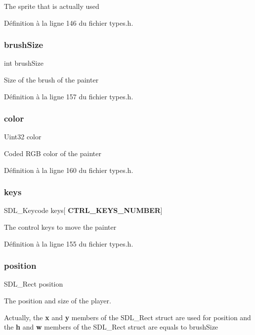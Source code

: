The sprite that is actually used 

Définition à la ligne 146 du fichier types.\+h.

\mbox{\label{structpainter_a9a97e37d5842d96acd10398a11107e96}} 
\subsubsection{brush\+Size}
{\footnotesize\ttfamily int brush\+Size}

Size of the brush of the painter 

Définition à la ligne 157 du fichier types.\+h.

\mbox{\label{structpainter_afd133e412238ed9f1e3ba52397115e8d}} 
\subsubsection{color}
{\footnotesize\ttfamily Uint32 color}

Coded R\+GB color of the painter 

Définition à la ligne 160 du fichier types.\+h.

\mbox{\label{structpainter_aaf7678c8bdea5f0a614d6bdb5af675fb}} 
\subsubsection{keys}
{\footnotesize\ttfamily S\+D\+L\+\_\+\+Keycode keys[\textbf{ C\+T\+R\+L\+\_\+\+K\+E\+Y\+S\+\_\+\+N\+U\+M\+B\+ER}]}

The control keys to move the painter 

Définition à la ligne 155 du fichier types.\+h.

\mbox{\label{structpainter_ac06cf6a292dc0e70e28b394fa481aef2}} 
\subsubsection{position}
{\footnotesize\ttfamily S\+D\+L\+\_\+\+Rect position}



The position and size of the player. 

Actually, the {\bfseries x} and {\bfseries y} members of the S\+D\+L\+\_\+\+Rect struct are used for position and the {\bfseries h} and {\bfseries w} members of the S\+D\+L\+\_\+\+Rect struct are equals to brush\+Size 

